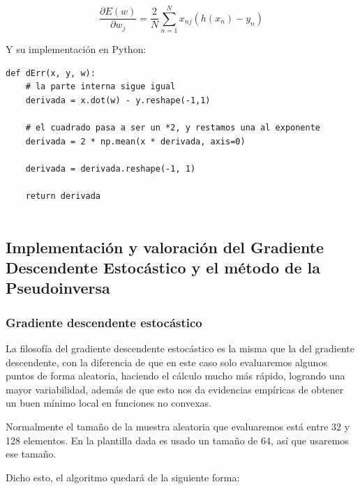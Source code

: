 \documentclass[12pt, spanish]{article}
\begin{document}
$$\frac{\partial E(w)}{\partial w_j} = \frac{2}{N}\sum_{n=1}^{N} x_{nj}(h(x_n) - y_n) $$

Y su implementación en Python:

\begin{lstlisting}
def dErr(x, y, w):
	# la parte interna sigue igual
	derivada = x.dot(w) - y.reshape(-1,1)

	# el cuadrado pasa a ser un *2, y restamos una al exponente
	derivada = 2 * np.mean(x * derivada, axis=0)

	derivada = derivada.reshape(-1, 1)

	return derivada
	
\end{lstlisting}


\newpage


\subsection{Implementación y valoración del Gradiente Descendente Estocástico y el método de la Pseudoinversa}

\subsubsection{Gradiente descendente estocástico}

La filosofía del gradiente descendente estocástico es la misma que la del gradiente descendente, con la diferencia de que en este caso solo evaluaremos algunos puntos de forma aleatoria, haciendo el cálculo mucho más rápido, logrando una mayor variabilidad, además de que esto nos da evidencias empíricas de obtener un buen mínimo local en funciones no convexas\cite{teoria}.

Normalmente el tamaño de la muestra aleatoria que evaluaremos está entre 32 y 128 elementos. En la plantilla dada es usado un tamaño de 64, así que usaremos ese tamaño.

Dicho esto, el algoritmo quedará de la siguiente forma:
\end{document}
